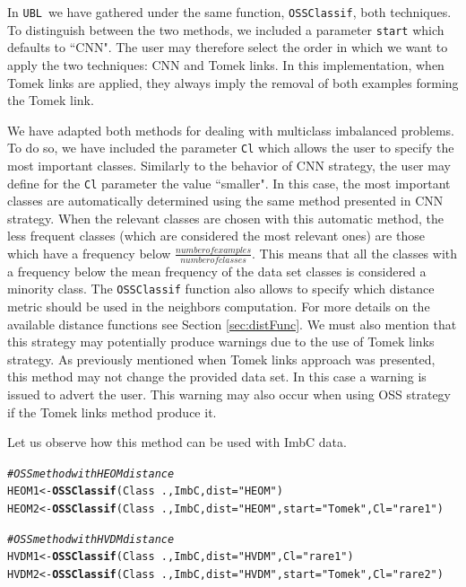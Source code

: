 \documentclass[10pt,a4paper]{article}\usepackage[]{graphicx}\usepackage[]{color}
\makeatletter
\newcommand{\hlstr}[1]{\textcolor[rgb]{0.192,0.494,0.8}{#1}}%
\newcommand{\hlcom}[1]{\textcolor[rgb]{0.678,0.584,0.686}{\textit{#1}}}%
\newcommand{\hlopt}[1]{\textcolor[rgb]{0,0,0}{#1}}%
\newcommand{\hlstd}[1]{\textcolor[rgb]{0.345,0.345,0.345}{#1}}%
\newcommand{\hlkwb}[1]{\textcolor[rgb]{0.69,0.353,0.396}{#1}}%
\newcommand{\hlkwc}[1]{\textcolor[rgb]{0.333,0.667,0.333}{#1}}%
\newcommand{\hlkwd}[1]{\textcolor[rgb]{0.737,0.353,0.396}{\textbf{#1}}}%
\newenvironment{kframe}{%
 \def\at@end@of@kframe{}%
 \ifinner\ifhmode%
  \def\at@end@of@kframe{\end{minipage}}%
  \begin{minipage}{\columnwidth}%
 \fi\fi%
 \def\FrameCommand##1{\hskip\@totalleftmargin \hskip-\fboxsep
 \colorbox{shadecolor}{##1}\hskip-\fboxsep
     \hskip-\linewidth \hskip-\@totalleftmargin \hskip\columnwidth}%
 \MakeFramed {\advance\hsize-\width
   \@totalleftmargin\z@ \linewidth\hsize
   \@setminipage}}%
 {\par\unskip\endMakeFramed%
 \at@end@of@kframe}
\newenvironment{knitrout}{}{} %
\newcommand{\UBL}{\texttt{UBL}\ }
\makeatother
\begin{document}
In \UBL we have gathered under the same function, \texttt{OSSClassif}, both techniques. To distinguish between the two methods, we included a parameter \texttt{start} which defaults to ``CNN". The user may therefore select the order in which we want to apply the two techniques: CNN and Tomek links. In this implementation, when Tomek links are applied, they always imply the removal of both examples forming the Tomek link. 

We have adapted both methods for dealing with multiclass imbalanced problems. To do so, we have included the parameter \texttt{Cl} which allows the user to specify the most important classes. Similarly to the behavior of CNN strategy, the user may define for the \texttt{Cl} parameter the value ``smaller". In this case, the most important classes are automatically determined using the same method presented in CNN strategy. When the relevant classes are chosen with this automatic method, the less frequent classes (which are considered the most relevant ones) are those which have a frequency below $\frac{number of examples}{number of classes}$. This means that all the classes with a frequency below the mean frequency of the data set classes is considered a minority class. The \texttt{OSSClassif} function also allows to specify which distance metric should be used in the neighbors computation. For more details on the available distance functions see Section \ref{sec:distFunc}. We must also mention that this strategy may potentially produce warnings due to the use of Tomek links strategy. As previously mentioned when Tomek links approach was presented, this method may not change the provided data set. In this case a warning is issued to advert the user. This warning may also occur when using OSS strategy if the Tomek links method produce it.


Let us observe how this method can be used with ImbC data.

\begin{knitrout}\footnotesize
{}\color{fgcolor}\begin{kframe}
\begin{alltt}
\hlcom{# OSS method with HEOM distance}
\hlstd{HEOM1} \hlkwb{<-} \hlkwd{OSSClassif}\hlstd{(Class}\hlopt{~}\hlstd{., ImbC,} \hlkwc{dist}\hlstd{=}\hlstr{"HEOM"}\hlstd{)}
\hlstd{HEOM2} \hlkwb{<-} \hlkwd{OSSClassif}\hlstd{(Class}\hlopt{~}\hlstd{., ImbC,} \hlkwc{dist}\hlstd{=}\hlstr{"HEOM"}\hlstd{,} \hlkwc{start}\hlstd{=}\hlstr{"Tomek"}\hlstd{,} \hlkwc{Cl}\hlstd{=}\hlstr{"rare1"}\hlstd{)}

\hlcom{# OSS method with HVDM distance}
\hlstd{HVDM1} \hlkwb{<-} \hlkwd{OSSClassif}\hlstd{(Class}\hlopt{~}\hlstd{., ImbC,} \hlkwc{dist}\hlstd{=}\hlstr{"HVDM"}\hlstd{,} \hlkwc{Cl}\hlstd{=}\hlstr{"rare1"}\hlstd{)}
\hlstd{HVDM2} \hlkwb{<-} \hlkwd{OSSClassif}\hlstd{(Class}\hlopt{~}\hlstd{., ImbC,} \hlkwc{dist}\hlstd{=}\hlstr{"HVDM"}\hlstd{,} \hlkwc{start}\hlstd{=}\hlstr{"Tomek"}\hlstd{,} \hlkwc{Cl}\hlstd{=}\hlstr{"rare2"}\hlstd{)}
\end{alltt}
\end{kframe}
\end{knitrout}
\end{document}
